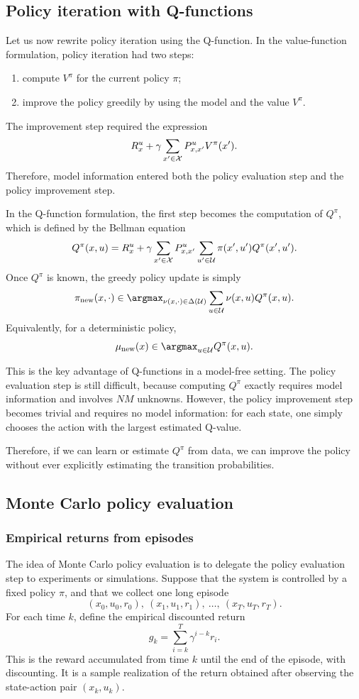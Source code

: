 \subsection{Policy iteration with Q-functions}

Let us now rewrite policy iteration using the Q-function. In the value-function formulation,
policy iteration had two steps:
\begin{enumerate}
    \item compute \(V^\pi\) for the current policy \(\pi\);
    \item improve the policy greedily by using the model and the value \(V^\pi\).
\end{enumerate}
The improvement step required the expression
\[
R_x^u+\gamma\sum_{x'\in\mathcal{X}}P^u_{x,x'}V^\pi(x').
\]
Therefore, model information entered both the policy evaluation step and the policy improvement
step.

In the Q-function formulation, the first step becomes the computation of \(Q^\pi\), which is
defined by the Bellman equation
\[
Q^\pi(x,u)
=
R_x^u
+
\gamma\sum_{x'\in\mathcal{X}}P^u_{x,x'}
\sum_{u'\in\mathcal{U}}\pi(x',u')Q^\pi(x',u').
\]
Once \(Q^\pi\) is known, the greedy policy update is simply
\[
\pi_{\mathrm{new}}(x,\cdot)
\in
\argmax_{\nu(x,\cdot)\in\Delta(\cU)}
\sum_{u\in\cU}\nu(x,u)Q^\pi(x,u).
\]
Equivalently, for a deterministic policy,
\[
\mu_{\mathrm{new}}(x)
\in
\argmax_{u\in\cU}Q^\pi(x,u).
\]

This is the key advantage of Q-functions in a model-free setting. The policy evaluation step is
still difficult, because computing \(Q^\pi\) exactly requires model information and involves
\(NM\) unknowns. However, the policy improvement step becomes trivial and requires no model
information: for each state, one simply chooses the action with the largest estimated Q-value.

Therefore, if we can learn or estimate \(Q^\pi\) from data, we can improve the policy without
ever explicitly estimating the transition probabilities.

\subsection{Monte Carlo policy evaluation}

\subsubsection{Empirical returns from episodes}

The idea of Monte Carlo policy evaluation is to delegate the policy evaluation step to
experiments or simulations. Suppose that the system is controlled by a fixed policy \(\pi\), and
that we collect one long episode
\[
(x_0,u_0,r_0),\ (x_1,u_1,r_1),\ \dots,\ (x_T,u_T,r_T).
\]
For each time \(k\), define the empirical discounted return
\[
g_k
=
\sum_{i=k}^{T}\gamma^{i-k}r_i.
\]
This is the reward accumulated from time \(k\) until the end of the episode, with discounting.
It is a sample realization of the return obtained after observing the state-action pair
\((x_k,u_k)\).

